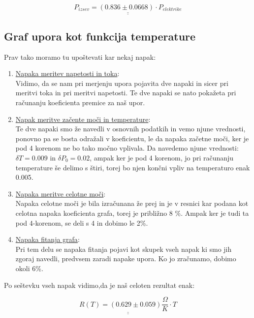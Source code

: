 \documentclass[11pt, a4paper]{article}
\theoremstyle{definition}
\theoremstyle{example}
\theoremstyle{izrek}
\begin{document}
$$\underline{\underline{P_{izsev}=(0.836 \pm 0.0668)\cdot P_{elektrike}}}$$

\subsection{Graf upora kot funkcija temperature}
Prav tako moramo tu upoštevati kar nekaj napak:
\begin{enumerate}
\item \underline{Napaka meritev napetosti in toka}:\\
Vidimo, da se nam pri merjenju upora pojavita dve napaki in sicer pri meritvi toka in pri meritvi napetosti. Te dve napaki se nato pokažeta pri računanju koeficienta premice za naš upor. 
\item \underline{Napak meritve začente moči in temperature}: \\
Te dve napaki smo že navedli v osnovnih podatkih in vemo njune vrednosti, ponovno pa se bosta odražali v koeficientu, le da napaka začetne moči, ker je pod 4 korenom ne bo tako močno vplivala. Da navedemo njune vrednosti: $\delta T=0.009$ in $\delta P_0= 0.02$, ampak ker je pod 4 korenom, jo pri računanju temperature še delimo s štiri, torej bo njen končni vpliv na temperaturo enak 0.005.
\item \underline{Napaka meritve celotne moči}:\\
Napaka celotne moči je bila izračunana že prej in je v resnici kar podana kot celotna napaka koeficienta grafa, torej je približno 8 \%. Ampak ker je tudi ta pod 4-korenom, se deli s 4 in dobimo le 2\%.
\item \underline{Napaka fitanja grafa}: \\
Pri tem delu se napaka fitanja pojavi kot skupek vseh napak ki smo jih zgoraj navedli, predvsem zaradi napake upora. Ko jo zračunamo, dobimo okoli 6\%.
\end{enumerate}

Po seštevku vseh napak vidimo,da je naš celoten rezultat enak:

$$\underline{\underline{R(T)=(0.629 \pm 0.059 )\frac{\Omega}{K}\cdot T}}$$
\end{document}
